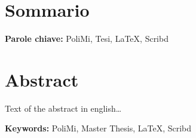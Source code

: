 \cleardoublepage



\begingroup

\let\cleardoublepage\relax
\let\cleardoublepage\relax

\chapter*{Sommario}

\lipsum[1]

\medskip

\noindent \textbf{Parole chiave:} 
PoliMi,
Tesi,
LaTeX,
Scribd




\chapter*{Abstract}

Text of the abstract in english\dots\\
\lipsum[1]

\medskip

\noindent \textbf{Keywords:} 
PoliMi,
Master Thesis,
LaTeX,
Scribd

\endgroup			